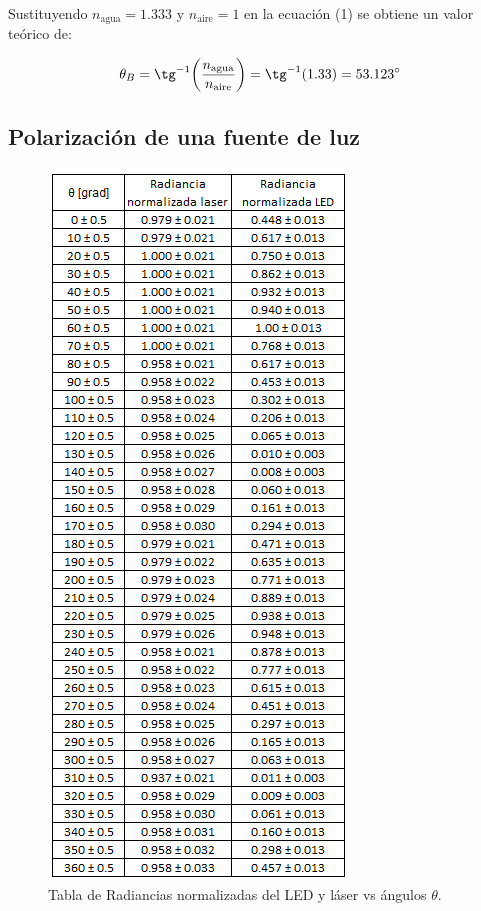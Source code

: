 \documentclass[DIV=calc, paper=a4, fontsize=10pt]{scrartcl}
\begin{document}
Sustituyendo $n_{\text{agua}} = 1.333 $ y $n_{\text{aire}} = 1$ en la ecuación (1) se obtiene un valor teórico de:

\begin{equation*}
    \theta_{B} = \tg^{-1}{\left(\frac{n_{\text{agua}}}{n_{\text{aire}}}\right)} = \tg^{-1}(1.33) = 53.123^{\circ}
\end{equation*}

\subsection*{\textcolor{carmine}{Polarización de una fuente de luz}}

\begin{figure}[H]
    \centering
    \includegraphics[scale=0.75]{tablas/tabla 2.PNG}
    \caption{Tabla de Radiancias normalizadas del LED y láser vs ángulos $\theta$.}
    \label{fig:my_label}
\end{figure}
\end{document}
